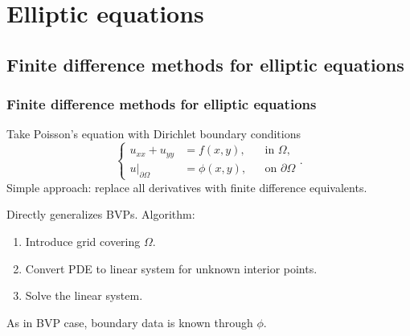 \documentclass{beamer}
\begin{document}
\section{Elliptic equations}

\subsection{Finite difference methods for elliptic equations}

\begin{frame}
  \frametitle{Finite difference methods for elliptic equations}

  Take Poisson's equation with Dirichlet boundary conditions
  \begin{equation*}
    \left\{
      \begin{aligned}
        u_{x x} + u_{y y} & = f(x, y), && \text{in } \Omega, \\
        u\big |_{\partial\Omega} & = \phi(x, y), && \text{on }
        \partial\Omega
      \end{aligned}
    \right. .
  \end{equation*}
  Simple approach: replace all derivatives with finite difference
  equivalents. \pause

  \vspace{1ex}

  Directly generalizes BVPs. Algorithm:
  \begin{enumerate}
  \item<2-> Introduce grid covering $\Omega$.
  \item<3-> Convert PDE to linear system for unknown interior points.
  \item<4-> Solve the linear system.
  \end{enumerate} \pause[5]
  As in BVP case, boundary data is known through $\phi$.

\end{frame}
\end{document}
